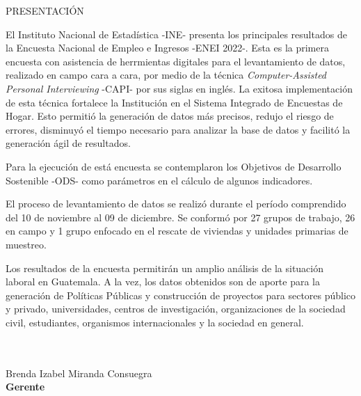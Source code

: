 \begin{center}
{\Bold \LARGE \color{color3} PRESENTACIÓN}\\[2cm]
\end{center}

El Instituto Nacional de Estadística -INE- presenta los principales resultados de la Encuesta Nacional de Empleo e Ingresos -ENEI 2022-. Esta es la primera encuesta con asistencia de herrmientas digitales para el levantamiento de datos, realizado en campo cara a cara, por medio de la técnica \textit{Computer-Assisted Personal Interviewing} -CAPI- por sus siglas en inglés. La exitosa implementación de esta técnica fortalece la Institución en el Sistema Integrado de Encuestas de Hogar. Esto permitió la generación de datos más precisos, redujo el riesgo de errores, disminuyó el tiempo necesario para analizar la base de datos y facilitó la generación ágil de resultados.

Para la ejecución de está encuesta se contemplaron los Objetivos de Desarrollo Sostenible -ODS- como parámetros en el cálculo de algunos indicadores. 

El proceso de levantamiento de datos se realizó durante el período comprendido del 10 de noviembre al 09 de diciembre. Se conformó por 27 grupos de trabajo,  26 en campo y 1 grupo enfocado en el rescate de viviendas y unidades primarias de muestreo.

Los resultados de la encuesta permitirán un amplio análisis de la situación laboral en Guatemala. A la vez, los datos obtenidos son de aporte para la generación de Políticas Públicas y construcción de proyectos para sectores público y privado, universidades, centros de investigación, organizaciones de la sociedad civil, estudiantes, organismos internacionales y la sociedad en general.\\
\\
\\
\begin{center}
Brenda Izabel Miranda Consuegra\\
\textbf{Gerente}
\end{center}

